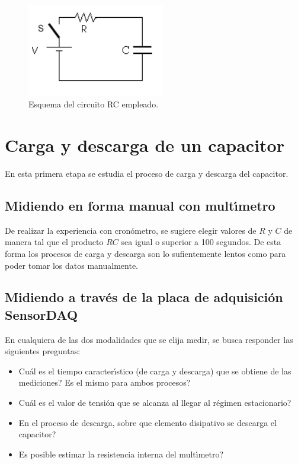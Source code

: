 \documentclass[laboratorio]{guia}
\begin{document}
\begin{figure}[t!]
    \centering
    \includegraphics[width=6cm]{LG05--000.png}
    \caption{Esquema del circuito RC empleado.}
    \label{fig:circuitoRC}
\end{figure}

\section{Carga y descarga de un capacitor}

En esta primera etapa se estudia el proceso de carga y descarga del capacitor. 

\subsection{Midiendo en forma manual con mult\'\i metro}

De realizar la experiencia con cron\'ometro, se sugiere elegir valores de $R$ y
$C$ de manera tal que el producto $RC$ sea igual o superior a 100 segundos. De
esta forma los procesos de carga y descarga son lo sufientemente lentos como
para poder tomar los datos manualmente. 

\subsection{Midiendo a trav\'es de la placa de adquisici\'on SensorDAQ}

En cualquiera de las dos modalidades que se elija medir, se busca responder
las siguientes preguntas:
\begin{itemize}
    \item Cu\'al es el tiempo caracter\'\i stico (de carga y descarga) que se 
        obtiene de las  mediciones? Es el mismo para ambos procesos?
    \item Cu\'al es el valor de tensi\'on que se alcanza al llegar al 
        r\'egimen estacionario? 
    \item En el proceso de descarga, sobre que elemento disipativo se 
        descarga el capacitor?
    \item Es posible estimar la resistencia interna del mult\'\i metro? 
\end{itemize}
\end{document}

